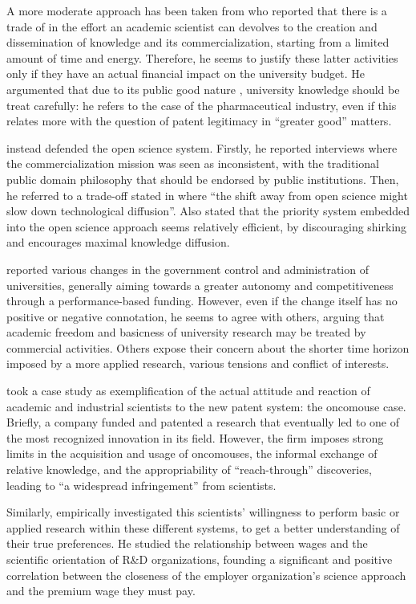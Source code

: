 A more moderate approach has been taken from \citet{Beath2000} who reported that there is a trade of in the effort an academic scientist can devolves to the creation and dissemination of knowledge and its commercialization, starting from a limited amount of time and energy. Therefore, he seems to justify these latter activities only if they have an actual financial impact on the university budget. He argumented that due to its public good nature \citep{Muscio2013}, university knowledge should be treat carefully: he refers to the case of the pharmaceutical industry, even if this relates more with the question of patent legitimacy in \enquote{greater good} matters.

\citet{Siegel2003a} instead defended the open science system. Firstly, he reported interviews where the commercialization mission was seen as inconsistent, with the traditional public domain philosophy that should be endorsed by public institutions. Then, he referred to a trade-off stated in \citet{Nelson2001} where \enquote{the shift away from open science might slow down technological diffusion}. Also \citet{Stern2004} stated that the priority system embedded into the open science approach seems relatively efficient, by discouraging shirking and encourages maximal knowledge diffusion.

\citet{Rasmussen2006} reported various changes in the government control and administration of universities, generally aiming towards a greater autonomy and competitiveness through a performance-based funding. However, even if the change itself has no positive or negative connotation, he seems to agree with others, arguing that academic freedom and basicness of university research may be treated by commercial activities. Others expose their concern about the shorter time horizon imposed by a more applied research, various tensions and conflict of interests. 

\citet{Murray2005} took a case study as exemplification of the actual attitude and reaction of academic and industrial scientists to the new patent system: the oncomouse case. Briefly, a company funded and patented a research that eventually led to one of the most recognized innovation in its field. However, the firm imposes strong limits in the acquisition and usage of oncomouses, the informal exchange of relative knowledge, and the appropriability of \enquote{reach-through} discoveries, leading to \enquote{a widespread infringement} from scientists. 

Similarly, \citet{Stern2004} empirically investigated this scientists' willingness to perform basic or applied research within these different systems, to get a better understanding of their true preferences. He studied the relationship between wages and the scientific orientation of R\&D organizations, founding a significant and positive correlation between the closeness of the employer organization's science approach and the premium wage they must pay.

